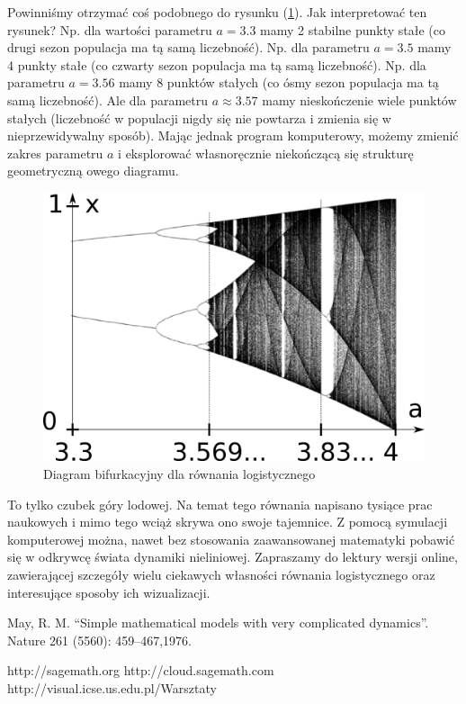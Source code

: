 \documentclass[12pt]{article}
\begin{document}
Powinniśmy otrzymać coś podobnego do rysunku (\ref{fig:bd}). Jak
interpretować ten rysunek?  Np. dla wartości parametru $a=3.3$ mamy 2
stabilne punkty stałe (co drugi sezon populacja ma tą samą
liczebność). Np. dla parametru $a=3.5$ mamy 4 punkty stałe (co czwarty
sezon populacja ma tą samą liczebność). Np. dla parametru $a=3.56$
mamy 8 punktów stałych (co ósmy sezon populacja ma tą samą
liczebność). Ale dla parametru $a\approx 3.57$ mamy nieskończenie
wiele punktów stałych (liczebność w populacji nigdy się nie powtarza i
zmienia się w nieprzewidywalny sposób).  Mając jednak program
komputerowy, możemy zmienić zakres parametru $a$ i eksplorować
własnoręcznie niekończącą się strukturę geometryczną owego diagramu.
\begin{figure} %
  \begin{center}

    \includegraphics[width=0.8\linewidth]{Bifurcation_diagram.png}
  \end{center}
  \caption{Diagram bifurkacyjny dla równania logistycznego    \label{fig:bd} }
\end{figure}
To tylko czubek góry lodowej. Na temat tego równania napisano tysiące
prac naukowych i mimo tego wciąż skrywa ono swoje tajemnice. Z pomocą
symulacji komputerowej można, nawet bez stosowania zaawansowanej
matematyki pobawić się w odkrywcę świata dynamiki
nieliniowej. Zapraszamy do lektury wersji online, zawierającej
szczegóły wielu ciekawych własności równania logistycznego oraz
interesujące sposoby ich wizualizacji.

\begin{thebibliography}{1}
May, R. M. ``Simple mathematical models with very complicated dynamics''. Nature 261 (5560): 459–467,1976.

 http://sagemath.org
 http://cloud.sagemath.com
 http://visual.icse.us.edu.pl/Warsztaty

\end{thebibliography}
\end{document}
